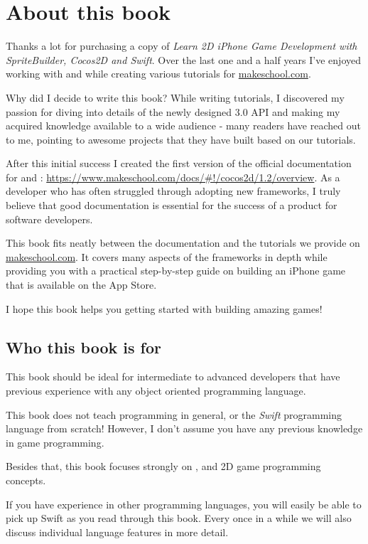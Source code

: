 \chapter{About this book}

Thanks a lot for purchasing a copy of \textit{Learn 2D iPhone Game Development
with SpriteBuilder, Cocos2D and Swift}. Over the last one and a half years I've
enjoyed working with \SB{} and \cocos{} while creating various tutorials for
\url{makeschool.com}. 

Why did I decide to write this book? While writing tutorials, I discovered my
passion for diving into details of the newly designed \cocos{} 3.0 API and
making my acquired knowledge available to a wide audience - many readers
have reached out to me, pointing to awesome projects that they have built based
on our tutorials.

After this initial success I created the first version of the official
documentation for \SB{} and \cocos{}:
\url{https://www.makeschool.com/docs/#!/cocos2d/1.2/overview}. As a developer
who has often struggled through adopting new frameworks, I truly believe that
good documentation is essential for the success of a product for software
developers.

This book fits neatly between the documentation and the tutorials we provide on
\url{makeschool.com}. It covers many aspects of the frameworks in depth while
providing you with a practical step-by-step guide on building an iPhone game that is available on the
App Store.

I hope this book helps you getting started with building amazing games!

\section{Who this book is for}
This book should be ideal for intermediate to advanced developers that have
previous experience with any object oriented programming language.

This book does not teach programming in general, or the \textit{Swift}
programming language from scratch! However, I don't assume you have any previous
knowledge in game programming.

Besides that, this book focuses strongly on \SB{}, \cocos{} and 2D game
programming concepts. 

If you have experience in other programming languages, you will easily be able
to pick up Swift as you read through this book. Every once in a while we will
also discuss individual language features in more detail.

